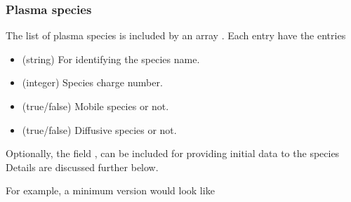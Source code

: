 \documentclass[letterpaper,10pt,english]{sphinxmanual}
\begin{document}
\subsubsection{Plasma species}
\label{\detokenize{Applications/CdrPlasmaModel:plasma-species}}\label{\detokenize{Applications/CdrPlasmaModel:chap-plasmaspeciesjson}}
\sphinxAtStartPar
The list of plasma species is included by an array .
Each entry  have the entries
\begin{itemize}
\item {} 
\sphinxAtStartPar
{} (string) For identifying the species name.

\item {} 
\sphinxAtStartPar
{} (integer) Species charge number.

\item {} 
\sphinxAtStartPar
{} (true/false) Mobile species or not.

\item {} 
\sphinxAtStartPar
{} (true/false) Diffusive species or not.

\end{itemize}

\sphinxAtStartPar
Optionally, the field , can be included for providing initial data to the species
Details are discussed further below.

\sphinxAtStartPar
For example, a minimum version would look like

\begin{sphinxVerbatim}[commandchars=\\\{\},formatcom=\scriptsize]
  \PYG{p}{[}
            
            
           
  \PYG{p}{]}
\end{sphinxVerbatim}
\end{document}
